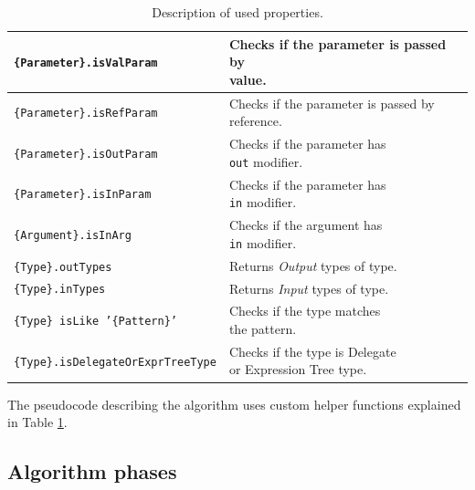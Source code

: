 \begin{table}[h]
\begin{center}
\begin{tabular}{ | l | l | } 
  \hline
  \texttt{\{Parameter\}.isValParam} & \makecell[lc]{Checks if the parameter is passed by\\ value.}\\ 
  \hline
  \texttt{\{Parameter\}.isRefParam} & \makecell[lc]{Checks if the parameter is passed by\\ reference.} \\ 
  \hline
  \texttt{\{Parameter\}.isOutParam} &\makecell[lc]{ Checks if the parameter has\\ \texttt{out} modifier.}\\ 
  \hline
  \texttt{\{Parameter\}.isInParam} & \makecell[lc]{Checks if the parameter has\\ \texttt{in} modifier.}\\ 
  \hline
  \texttt{\{Argument\}.isInArg} & \makecell[lc]{Checks if the argument has\\ \texttt{in} modifier.}\\ 
  \hline
  \texttt{\{Type\}.outTypes} & Returns \textit{Output} types of type.\\ 
  \hline
  \texttt{\{Type\}.inTypes} & Returns \textit{Input} types of type.\\ 
  \hline
  \texttt{\{Type\} isLike '\{Pattern\}'} & \makecell[lc]{Checks if the type matches\\ the pattern.}\\ 
  \hline
  \texttt{\{Type\}.isDelegateOrExprTreeType} & \makecell[lc]{Checks if the type is Delegate\\ or Expression Tree type.}\\ 
  \hline
\end{tabular}
\end{center}
\caption{Description of used properties.}
\label{table1:algorithmLegen}
\end{table}
\par
The pseudocode describing the algorithm uses custom helper functions explained in Table \ref{table1:algorithmLegen}.

\subsection{Algorithm phases}

